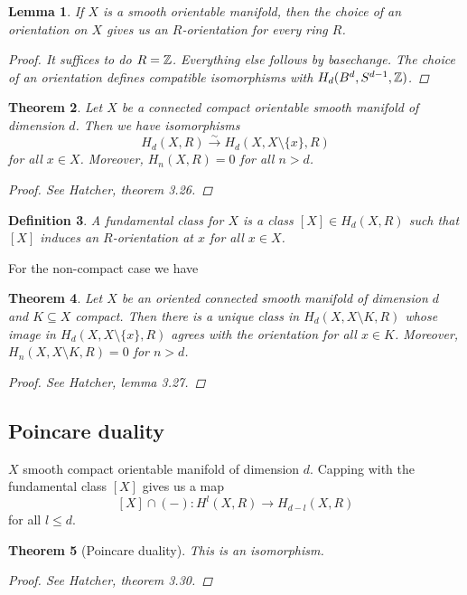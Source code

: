\documentclass[A4paper, british, reqno]{amsart}
\theoremstyle{darkgreentheorem}
\newtheorem{thm}{Theorem}[section]
\newtheorem{lm}[thm]{Lemma}
\theoremstyle{darkbluedefinition}
\newtheorem{defn}[thm]{Definition}
\theoremstyle{darkredexample}
\theoremstyle{remark}
\newcommand{\1}{\mathbbm{1}}
\newcommand{\sub}{\subseteq}
\begin{document}
\begin{lm}
    If $X$ is a smooth orientable manifold, then the choice of an orientation on $X$ gives us an $R$-orientation for every ring $R$.
    \begin{proof}
	It suffices to do $R=\mathbb{Z}$.
	Everything else follows by basechange.
	The choice of an orientation defines compatible isomorphisms with $H_{d}(B^{d},S^{d-1},\mathbb{Z})$.
    \end{proof}
\end{lm}

\begin{thm}
    Let $X$ be a connected compact orientable smooth manifold of dimension $d$.
    Then we have isomorphisms
    \[ H_{d}(X,R)\xrightarrow{\sim} H_{d}(X,X\setminus \{x\},R) \]
    for all $x\in X$.
    Moreover, $H_{n}(X,R)=0$ for all $n>d$.
    \begin{proof}
	See Hatcher, theorem 3.26.
    \end{proof}
\end{thm}

\begin{defn}
    A \textit{fundamental class} for $X$ is a class $[X]\in H_{d}(X,R)$ such that $[X]$ induces an $R$-orientation at $x$ for all $x\in X$.
\end{defn}

For the non-compact case we have

\begin{thm}
    Let $X$ be an oriented connected smooth manifold of dimension $d$ and $K\sub X$ compact.
    Then there is a unique class in $H_{d}(X,X\setminus K,R)$ whose image in $H_{d}(X,X\setminus\{x\},R)$ agrees with the orientation for all $x\in K$.
    Moreover, $H_{n}(X,X\setminus K,R)=0$ for $n>d$.
    \begin{proof}
	See Hatcher, lemma 3.27.
    \end{proof}
\end{thm}

\subsection{Poincare duality}

$X$ smooth compact orientable manifold of dimension $d$.
Capping with the fundamental class $[X]$ gives us a map
\[ [X]\cap (-)\colon H^{l}(X,R)\to H_{d-l}(X,R) \]
for all $l\leqslant d$.

\begin{thm}[Poincare duality]
    This is an isomorphism.
    \begin{proof}
	See Hatcher, theorem 3.30.
    \end{proof}
\end{thm}
\end{document}
